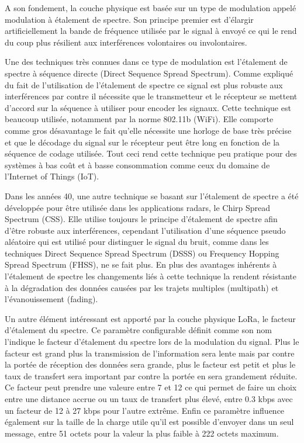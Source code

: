 A son fondement, la couche physique est basée sur un type de modulation appelé modulation à étalement de spectre. Son principe premier est d'élargir artificiellement la bande de fréquence utilisée par le signal à envoyé ce qui le rend du coup plus résilient aux interférences volontaires ou involontaires.

Une des techniques très connues dans ce type de modulation est l’étalement de spectre à séquence directe (Direct Sequence Spread Spectrum). Comme expliqué du fait de l'utilisation de l'étalement de spectre ce signal est plus robuste aux interférences par contre il nécessite que le transmetteur et le récepteur se mettent d’accord sur la séquence à utiliser pour encoder les signaux. Cette technique est beaucoup utilisée, notamment par la norme 802.11b (WiFi). Elle comporte comme gros désavantage le fait qu’elle nécessite une horloge de base très précise et que le décodage du signal sur le récepteur peut être long en fonction de la séquence de codage utilisée. Tout ceci rend cette technique peu pratique pour des systèmes à bas coût et à basse consommation comme ceux du domaine de l’Internet of Things (IoT).

Dans les années 40, une autre technique se basant sur l’étalement de spectre a été développée pour être utilisée dans les applications radars, le Chirp Spread Spectrum (CSS). Elle utilise toujours le principe d’étalement de spectre afin d’être robuste aux interférences, cependant l’utilisation d’une séquence pseudo aléatoire qui est utilisé pour distinguer le signal du bruit, comme dans les techniques Direct Sequence Spread Spectrum (DSSS) ou Frequency Hopping Spread Spectrum (FHSS), ne se fait plus. En plus des avantages inhérents à l’étalement de spectre les changements liés à cette technique la rendent résistante à la dégradation des données causées par les trajets multiples (multipath) et l’évanouissement (fading). \cite{lora_modulation_basics}

Un autre élément intéressant est apporté par la couche physique LoRa, le facteur d'étalement du spectre. Ce paramètre configurable définit comme son nom l'indique le facteur d'étalement du spectre lors de la modulation du signal. Plus le facteur est grand plus la transmission de l’information sera lente mais par contre la portée de réception des données sera grande, plus le facteur est petit et plus le taux de transfert sera important par contre la portée en sera grandement réduite. Ce facteur peut prendre une valeure entre 7 et 12 ce qui permet de faire un choix entre une distance accrue ou un taux de transfert plus élevé, entre 0.3 kbps avec un facteur de 12 à 27 kbps pour l'autre extrême. Enfin ce paramètre influence également sur la taille de la charge utile qu'il est possible d'envoyer dans un seul message, entre 51 octets pour la valeur la plus faible à 222 octets maximum. \cite{limits_lorawan}

